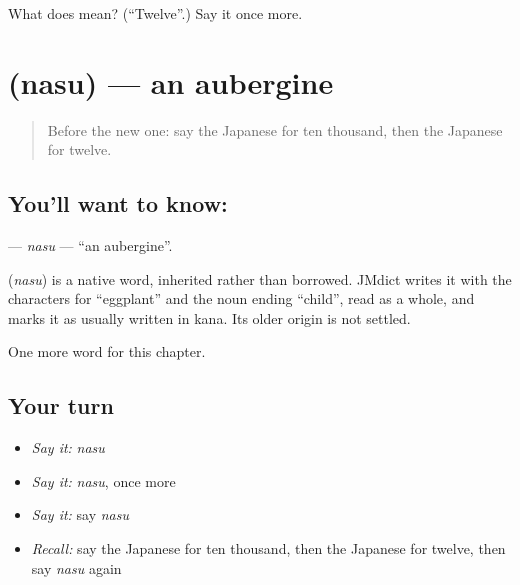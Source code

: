\begin{tcolorbox}[breakable,colback=teal!4,colframe=teal!35!black,title={Before you move on}]
What does  mean? (\textquotedblleft{}Twelve\textquotedblright{}.) Say it once more.
\end{tcolorbox}
\section[\texorpdfstring{\ja{なす} (nasu)}{なす (nasu)}]{ (nasu) — an aubergine}

\label{lesson:JA-C60-nasu}



\begin{quote}
Before the new one: say the Japanese for ten thousand, then the Japanese for twelve.
\end{quote}

\subsection*{You'll want to know: }
\textbf{} — \emph{nasu} — \textquotedblleft{}an aubergine\textquotedblright{}.

\begin{cousinweb}
\textbf{} (\emph{nasu}) is a native word, inherited rather than borrowed. JMdict writes it with the characters for \textquotedblleft{}eggplant\textquotedblright{} and the noun ending \textquotedblleft{}child\textquotedblright{}, read as a whole, and marks it as usually written in kana. Its older origin is not settled.
\end{cousinweb}

\begin{grammarlens}[title={What you've built}]
One more word for this chapter.
\end{grammarlens}

\subsection*{Your turn}
\begin{itemize}
\raggedright
  \item \emph{Say it:} \emph{nasu}
  \item \emph{Say it:} \emph{nasu}, once more
  \item \emph{Say it:} say \emph{nasu}
  \item \emph{Recall:} say the Japanese for ten thousand, then the Japanese for twelve, then say \emph{nasu} again
\end{itemize}

